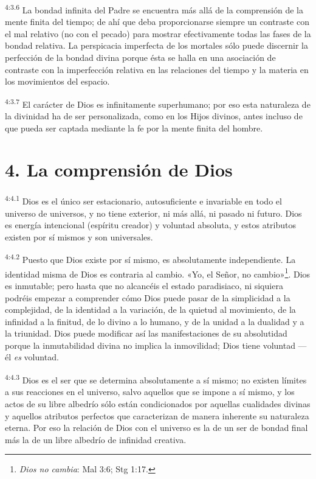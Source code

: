 \par
\textsuperscript{4:3.6} La bondad infinita del Padre se encuentra más allá de la comprensión de la mente finita del tiempo; de ahí que deba proporcionarse siempre un contraste con el mal relativo (no con el pecado) para mostrar efectivamente todas las fases de la bondad relativa. La perspicacia imperfecta de los mortales sólo puede discernir la perfección de la bondad divina porque ésta se halla en una asociación de contraste con la imperfección relativa en las relaciones del tiempo y la materia en los movimientos del espacio.

\par
\textsuperscript{4:3.7} El carácter de Dios es infinitamente superhumano; por eso esta naturaleza de la divinidad ha de ser personalizada, como en los Hijos divinos, antes incluso de que pueda ser captada mediante la fe por la mente finita del hombre.

\section*{4. La comprensión de Dios}
\par
\textsuperscript{4:4.1} Dios es el único ser estacionario, autosuficiente e invariable en todo el universo de universos, y no tiene exterior, ni más allá, ni pasado ni futuro. Dios es energía intencional (espíritu creador) y voluntad absoluta, y estos atributos existen por sí mismos y son universales.

\par
\textsuperscript{4:4.2} Puesto que Dios existe por sí mismo, es absolutamente independiente. La identidad misma de Dios es contraria al cambio. «Yo, el Señor, no cambio»\footnote{\textit{Dios no cambia}: Mal 3:6; Stg 1:17.}. Dios es inmutable; pero hasta que no alcancéis el estado paradisiaco, ni siquiera podréis empezar a comprender cómo Dios puede pasar de la simplicidad a la complejidad, de la identidad a la variación, de la quietud al movimiento, de la infinidad a la finitud, de lo divino a lo humano, y de la unidad a la dualidad y a la triunidad. Dios puede modificar así las manifestaciones de su absolutidad porque la inmutabilidad divina no implica la inmovilidad; Dios tiene voluntad ---él \textit{es} voluntad.

\par
\textsuperscript{4:4.3} Dios es el ser que se determina absolutamente a sí mismo; no existen límites a sus reacciones en el universo, salvo aquellos que se impone a sí mismo, y los actos de su libre albedrío sólo están condicionados por aquellas cualidades divinas y aquellos atributos perfectos que caracterizan de manera inherente su naturaleza eterna. Por eso la relación de Dios con el universo es la de un ser de bondad final más la de un libre albedrío de infinidad creativa.


